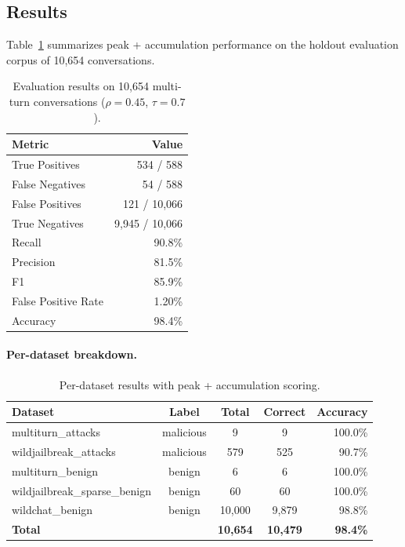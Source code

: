 \documentclass[11pt,a4paper]{article}
\begin{document}
\subsection{Results}

Table~\ref{tab:results} summarizes peak + accumulation performance on
the holdout evaluation corpus of 10,654 conversations.

\begin{table}[h]
\centering
\caption{Evaluation results on 10,654 multi-turn conversations
($\rho = 0.45$, $\tau = 0.7$).}
\label{tab:results}
\begin{tabular}{@{}lr@{}}
\toprule
Metric & Value \\
\midrule
True Positives & 534 / 588 \\
False Negatives & 54 / 588 \\
False Positives & 121 / 10,066 \\
True Negatives & 9,945 / 10,066 \\
\midrule
Recall & 90.8\% \\
Precision & 81.5\% \\
F1 & 85.9\% \\
False Positive Rate & 1.20\% \\
Accuracy & 98.4\% \\
\bottomrule
\end{tabular}
\end{table}

\paragraph{Per-dataset breakdown.}

\begin{table}[h]
\centering
\caption{Per-dataset results with peak + accumulation scoring.}
\label{tab:per-dataset}
\begin{tabular}{@{}lcccr@{}}
\toprule
Dataset & Label & Total & Correct & Accuracy \\
\midrule
multiturn\_attacks & malicious & 9 & 9 & 100.0\% \\
wildjailbreak\_attacks & malicious & 579 & 525 & 90.7\% \\
multiturn\_benign & benign & 6 & 6 & 100.0\% \\
wildjailbreak\_sparse\_benign & benign & 60 & 60 & 100.0\% \\
wildchat\_benign & benign & 10,000 & 9,879 & 98.8\% \\
\midrule
\textbf{Total} & & \textbf{10,654} & \textbf{10,479} & \textbf{98.4\%} \\
\bottomrule
\end{tabular}
\end{table}
\end{document}
